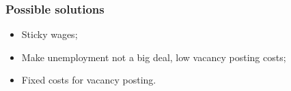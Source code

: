 \subsubsection{Possible solutions}
\begin{itemize}
    \item Sticky wages;
    \item Make unemployment not a big deal, low vacancy posting costs;
    \item Fixed costs for vacancy posting.
\end{itemize}